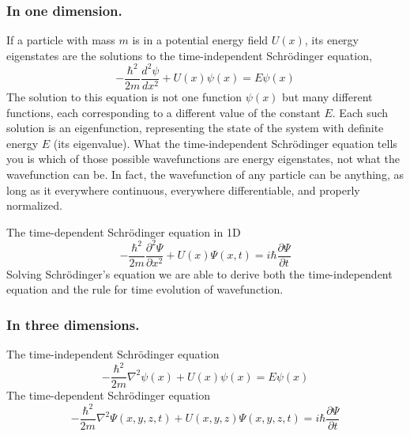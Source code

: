 \documentclass[../../main.tex]{subfiles}
\begin{document}
\subsubsection{In one dimension.} If a particle with mass $m$ is in a potential energy field $U(x)$, its energy eigenstates are the solutions to the time-independent Schrödinger equation,
\begin{equation*}
    -\frac{\hbar^2}{2m}\frac{d^2\psi}{dx^2}+U(x)\psi(x)=E\psi(x)
\end{equation*}
The solution to this equation is not one function $\psi(x)$ but many different functions, each corresponding to a different value of the constant $E$. Each such solution is an eigenfunction, representing the state of the system with definite energy $E$ (its eigenvalue). What the time-independent Schrödinger equation tells you is which of those possible wavefunctions are energy eigenstates, not what the wavefunction can be. In fact, the wavefunction of any particle can be anything, as long as it everywhere continuous, everywhere differentiable, and properly normalized.

The time-dependent Schrödinger equation in 1D
\begin{equation*}
    -\frac{\hbar^2}{2m}\frac{\partial^2{\Psi}}{\partial x^2}+U(x)\Psi(x,t)=i\hbar \frac{\partial {\Psi}}{\partial t}
\end{equation*}
Solving Schrödinger's equation we are able to derive both the time-independent equation and the rule for time evolution of wavefunction.

\subsubsection{In three dimensions.}  The time-independent Schrödinger equation
\begin{equation*}
    -\frac{\hbar^2}{2m}\nabla^2\psi (x)+U(x)\psi(x)=E\psi(x)
\end{equation*}
The time-dependent Schrödinger equation
\begin{equation*}
    -\frac{\hbar^2}{2m}\nabla^2 {\Psi}(x,y,z,t) + U(x,y,z)  {\Psi}(x,y,z,t) = i\hbar \frac{\partial {\Psi}}{\partial t}
\end{equation*}
\end{document}

